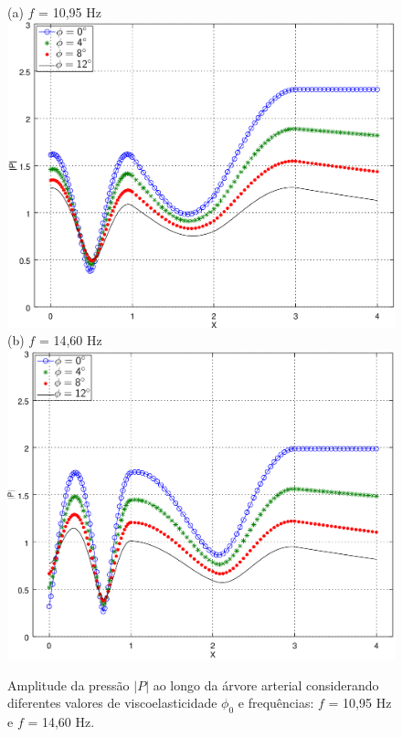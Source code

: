 \begin{figure}[!htbp]
	\centering
	(a) $f$ = 10,95 Hz\\
	\includegraphics[scale=0.7]{Figures/fig4_P_f10_95_viscoelasticity_NEW.png}\\
	(b) $f$ = 14,60 Hz\\
	\includegraphics[scale=0.7]{Figures/fig4_P_f14_60_viscoelasticity_NEW.png}\\
	\caption{Amplitude da pressão $|P|$ ao longo da árvore arterial considerando diferentes valores de viscoelasticidade $\phi_0$ e frequências: $f$ = 10,95 Hz e $f$ = 14,60 Hz.}
	\label{fig4b:arterial-tree}%
\end{figure}

